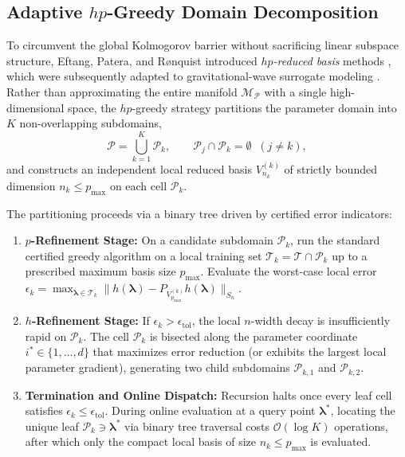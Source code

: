 \documentclass[11pt, a4paper]{article}
\begin{document}
\subsection{Adaptive $hp$-Greedy Domain Decomposition}

To circumvent the global Kolmogorov barrier without sacrificing linear subspace structure, Eftang, Patera, and R\o nquist introduced \emph{$hp$-reduced basis} methods \cite{Eftang2010,Eftang2011}, which were subsequently adapted to gravitational-wave surrogate modeling \cite{Field2014,Blackman2017}. Rather than approximating the entire manifold $\mathcal{M}_{\mathcal{P}}$ with a single high-dimensional space, the $hp$-greedy strategy partitions the parameter domain into $K$ non-overlapping subdomains,
\begin{equation}
\mathcal{P} = \bigcup_{k=1}^K \mathcal{P}_k , \qquad \mathcal{P}_j \cap \mathcal{P}_k = \emptyset \;\; (j \neq k),
\label{eq:domain_partition}
\end{equation}
and constructs an independent local reduced basis $V_{n_k}^{(k)}$ of strictly bounded dimension $n_k \le p_{\max}$ on each cell $\mathcal{P}_k$.

The partitioning proceeds via a binary tree driven by certified error indicators:
\begin{enumerate}
    \item \textbf{$p$-Refinement Stage:} On a candidate subdomain $\mathcal{P}_k$, run the standard certified greedy algorithm on a local training set $\mathcal{T}_k = \mathcal{T} \cap \mathcal{P}_k$ up to a prescribed maximum basis size $p_{\max}$. Evaluate the worst-case local error $\epsilon_k = \max_{\boldsymbol{\lambda} \in \mathcal{T}_k} \| h(\boldsymbol{\lambda}) - P_{V_{p_{\max}}^{(k)}} h(\boldsymbol{\lambda}) \|_{S_n}$.
    \item \textbf{$h$-Refinement Stage:} If $\epsilon_k > \epsilon_{\mathrm{tol}}$, the local $n$-width decay is insufficiently rapid on $\mathcal{P}_k$. The cell $\mathcal{P}_k$ is bisected along the parameter coordinate $i^* \in \{1,\dots,d\}$ that maximizes error reduction (or exhibits the largest local parameter gradient), generating two child subdomains $\mathcal{P}_{k,1}$ and $\mathcal{P}_{k,2}$.
    \item \textbf{Termination and Online Dispatch:} Recursion halts once every leaf cell satisfies $\epsilon_k \le \epsilon_{\mathrm{tol}}$. During online evaluation at a query point $\boldsymbol{\lambda}^*$, locating the unique leaf $\mathcal{P}_k \ni \boldsymbol{\lambda}^*$ via binary tree traversal costs $\mathcal{O}(\log K)$ operations, after which only the compact local basis of size $n_k \le p_{\max}$ is evaluated.
\end{enumerate}
\end{document}
